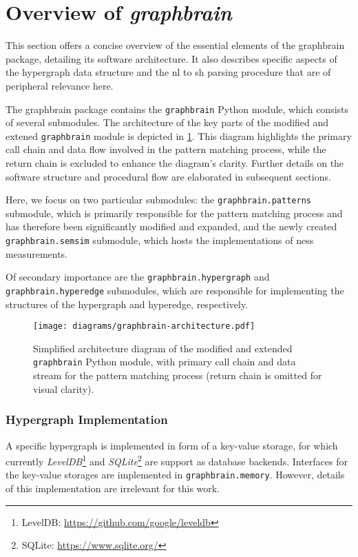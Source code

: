\documentclass[11pt, numbers=noenddot]{scrreprt}
\begin{document}
\section{Overview of \textit{graphbrain}}
This section offers a concise overview of the essential elements of the graphbrain package, detailing its software architecture. It also describes specific aspects of the hypergraph data structure and the \gls{nl} to \gls{sh} parsing procedure that are of peripheral relevance here.

The graphbrain package contains the \texttt{graphbrain} Python module, which consists of several submodules. The architecture of the key parts of the modified and extened \texttt{graphbrain} module is depicted in \cref{fig:graphbrain-architecture}. This diagram highlights the primary call chain and data flow involved in the pattern matching process, while the return chain is excluded to enhance the diagram's clarity. Further details on the software structure and procedural flow are elaborated in subsequent sections.

Here, we focus on two particular submodules: the \texttt{graphbrain.patterns} submodule, which is primarily responsible for the pattern matching process and has therefore been significantly modified and expanded, and the newly created \texttt{graphbrain.semsim} submodule, which hosts the implementations of \gls{ness} measurements. 

Of secondary importance are the \texttt{graphbrain.hypergraph} and \texttt{graphbrain.hyperedge} submodules, which are responsible for implementing the structures of the hypergraph and hyperedge, respectively.

\begin{figure}
\centering
\texttt{[image: diagrams/graphbrain-architecture.pdf]}
\caption{Simplified architecture diagram of the modified and extended \texttt{graphbrain} Python module, with primary call chain and data stream for the pattern matching process (return chain is omitted for visual clarity).}
\label{fig:graphbrain-architecture}
\end{figure}


\subsubsection{Hypergraph Implementation}
A specific hypergraph is implemented in form of a key-value storage, for which currently \textit{LevelDB}\footnote{LevelDB: \url{https://github.com/google/leveldb}} and \textit{SQLite}\footnote{SQLite: \url{https://www.sqlite.org/}} are support as database backends. Interfaces for the key-value storages are implemented in \texttt{graphbrain.memory}. However, details of this implementation are irrelevant for this work.
\end{document}
